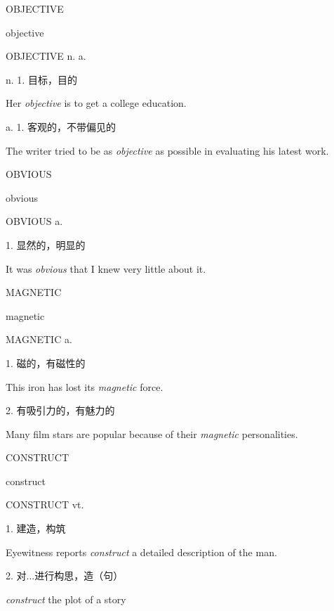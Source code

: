 \begin{flashcard}{
OBJECTIVE

objective
}
\begin{center}
OBJECTIVE n. a. 
\end{center}
n. 1. 目标，目的

Her \textit{objective} is to get a college education.

a. 1. 客观的，不带偏见的

The writer tried to be as \textit{objective} as possible in evaluating his latest work.

\end{flashcard}
\begin{flashcard}{
OBVIOUS

obvious
}
\begin{center}
OBVIOUS a. 
\end{center}
1. 显然的，明显的

It was \textit{obvious} that I knew very little about it.

\end{flashcard}
\begin{flashcard}{
MAGNETIC

magnetic
}
\begin{center}
MAGNETIC a. 
\end{center}
1. 磁的，有磁性的

This iron has lost its \textit{magnetic} force.

2. 有吸引力的，有魅力的

Many film stars are popular because of their \textit{magnetic} personalities.

\end{flashcard}
\begin{flashcard}{
CONSTRUCT

construct
}
\begin{center}
CONSTRUCT vt. 
\end{center}
1. 建造，构筑

Eyewitness reports \textit{construct} a detailed description of the man.

2. 对...进行构思，造（句）

\textit{construct} the plot of a story

\end{flashcard}
